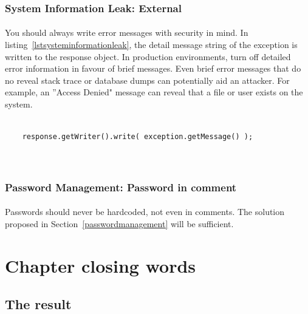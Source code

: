 \documentclass[11pt,english,a4paper]{report}
\begin{document}
\subsubsection{System Information Leak: External}
\paragraph{}
You should always write error messages with security in mind.
In listing~\ref{lstsysteminformationleak}, the detail message string of the exception is written to the response object.
In production environments, turn off detailed error information in favour of brief messages.
Even brief error messages that do no reveal stack trace or database dumps can potentially aid an attacker. 
For example, an ''Access Denied" message can reveal that a file or user exists on the system.

\begin{lstlisting}[caption=Parts of the method mapException, label=lstsysteminformationleak]
	
	response.getWriter().write( exception.getMessage() );

	
\end{lstlisting}

\subsubsection{Password Management: Password in comment}
\paragraph{}
Passwords should never be hardcoded, not even in comments.
The solution proposed in Section~\ref{passwordmanagement} will be sufficient.


\section{Chapter closing words}

\subsection{The result}
\end{document}
